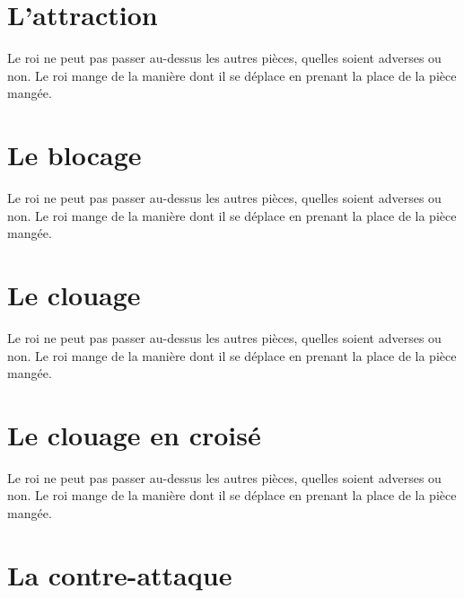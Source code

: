 \documentclass[a5paper,openany,twocolumn]{book}%
\begin{document}
\chapter{L'attraction}

Le roi ne peut pas passer au-dessus les autres pièces, quelles soient adverses ou non. Le roi mange de la manière dont il se déplace en prenant la place de la pièce mangée. 


\chapter{Le blocage}

Le roi ne peut pas passer au-dessus les autres pièces, quelles soient adverses ou non. Le roi mange de la manière dont il se déplace en prenant la place de la pièce mangée. 


\chapter{Le clouage}

Le roi ne peut pas passer au-dessus les autres pièces, quelles soient adverses ou non. Le roi mange de la manière dont il se déplace en prenant la place de la pièce mangée. 


\chapter{Le clouage en croisé}

Le roi ne peut pas passer au-dessus les autres pièces, quelles soient adverses ou non. Le roi mange de la manière dont il se déplace en prenant la place de la pièce mangée. 


\chapter{La contre-attaque}
\end{document}
